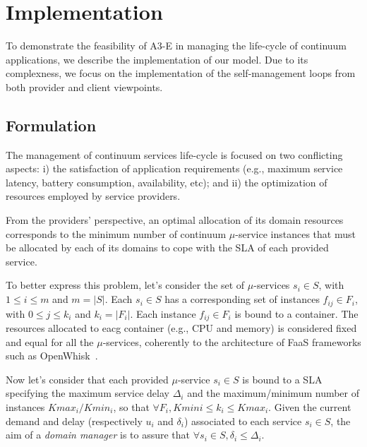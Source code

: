 \section{Implementation}\label{sec:implementation}


To demonstrate the feasibility of A3-E in managing the life-cycle of continuum applications, we describe the implementation of our model. Due to its complexness, we focus on the implementation of the self-management loops from both provider and client viewpoints.

\subsection{Formulation}

The management of continuum services life-cycle is focused on two conflicting aspects: i) the satisfaction of application requirements (e.g., maximum service latency, battery consumption, availability, etc); and ii) the optimization of resources employed by service providers. 

From the providers' perspective, an optimal allocation of its domain resources corresponds to the minimum number of continuum $\mu$-service instances that must be allocated by each of its domains to cope with the SLA of each provided service.%

To better express this problem, let's consider the set of $\mu$-services $s_i \in S$, with $1 \le i \le m$ and $m = |S|$. Each $s_i \in S$ has a corresponding set of instances $f_{ij} \in F_i$, with $0 \le j \le k_i$ and $k_i = |F_i|$. Each instance $f_{ij} \in F_i$ is bound to a container. The resources allocated to eacg container (e.g., CPU and memory) is considered fixed and equal for all the $\mu$-services, coherently to the architecture of FaaS frameworks such as OpenWhisk~\cite{OpenWhisk}. 

Now let's consider that each provided $\mu$-service $s_i \in S$ is bound to a SLA specifying the maximum service delay $\Delta_i$ and the maximum/minimum number of instances $Kmax_{i}/Kmin_{i}$, so that $\forall F_i, Kmin{i} \le k_i \le Kmax_{i}$. %
Given the current demand and delay (respectively $u_i$ and $\delta_i$) associated to each service $s_i \in S$, the aim of a \textit{domain manager} is to assure that $\forall s_i \in S, \delta_i \le \Delta_i$. 

